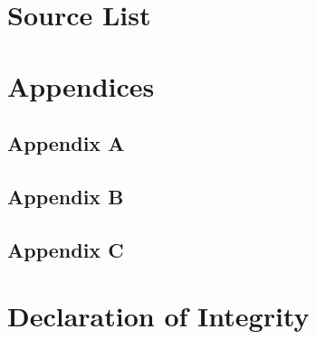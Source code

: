 \documentclass[11pt]{article}
\begin{document}
\section{Source List}
\section{Appendices}
\subsection{Appendix A}
\subsection{Appendix B}
\subsection{Appendix C}
	
\section{Declaration of Integrity}
\end{document}
